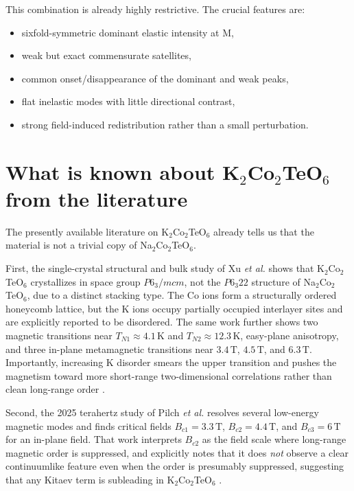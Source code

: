 \documentclass[11pt]{article}
\begin{document}
This combination is already highly restrictive. The crucial features are:
\begin{itemize}[leftmargin=2em,itemsep=0.35em]
    \item sixfold-symmetric dominant elastic intensity at M,
    \item weak but exact commensurate satellites,
    \item common onset/disappearance of the dominant and weak peaks,
    \item flat inelastic modes with little directional contrast,
    \item strong field-induced redistribution rather than a small perturbation.
\end{itemize}

\section{What is known about K$_2$Co$_2$TeO$_6$ from the literature}

The presently available literature on K$_2$Co$_2$TeO$_6$ already tells us that the material is not a trivial copy of Na$_2$Co$_2$TeO$_6$.

First, the single-crystal structural and bulk study of Xu \emph{et al.} shows that K$_2$Co$_2$TeO$_6$ crystallizes in space group \(P6_3/mcm\), not the \(P6_3 22\) structure of Na$_2$Co$_2$TeO$_6$, due to a distinct stacking type. The Co ions form a structurally ordered honeycomb lattice, but the K ions occupy partially occupied interlayer sites and are explicitly reported to be disordered. The same work further shows two magnetic transitions near \(T_{N1}\approx 4.1\,\mathrm{K}\) and \(T_{N2}\approx 12.3\,\mathrm{K}\), easy-plane anisotropy, and three in-plane metamagnetic transitions near \(3.4\,\mathrm{T}\), \(4.5\,\mathrm{T}\), and \(6.3\,\mathrm{T}\). Importantly, increasing K disorder smears the upper transition and pushes the magnetism toward more short-range two-dimensional correlations rather than clean long-range order \cite{Xu2023K2Co2TeO6}.

Second, the 2025 terahertz study of Pilch \emph{et al.} resolves several low-energy magnetic modes and finds critical fields \(B_{c1}=3.3\,\mathrm{T}\), \(B_{c2}=4.4\,\mathrm{T}\), and \(B_{c3}=6\,\mathrm{T}\) for an in-plane field. That work interprets \(B_{c2}\) as the field scale where long-range magnetic order is suppressed, and explicitly notes that it does \emph{not} observe a clear continuumlike feature even when the order is presumably suppressed, suggesting that any Kitaev term is subleading in K$_2$Co$_2$TeO$_6$ \cite{Pilch2025K2Co2TeO6THz}.
\end{document}
